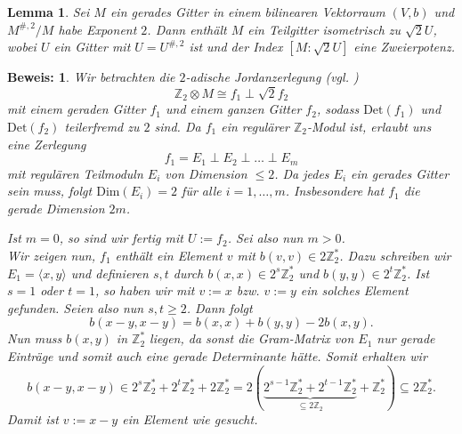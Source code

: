 \documentclass[12pt,a4paper,halfparskip,headsepline,bibtotocnumbered]{scrreprt}
\theoremstyle{nummermitklammern}
\newtheorem{lemma}[defsatzusw]{Lemma}
\theoremstyle{nonumberbreak}
\newtheorem{beweis}{Beweis:}
\newcommand{\Z}{\mathbb{Z}}
\newcommand{\Det}{\text{Det}}
\begin{document}
\begin{framed}
	\begin{lemma} \label{lem:2sub}
		Sei $M$ ein gerades Gitter in einem bilinearen Vektorraum $(V,b)$ und $M^{\#, 2} / M$ habe Exponent $2$. Dann enthält $M$ ein Teilgitter isometrisch zu $\sqrt{2}U$, wobei $U$ ein Gitter mit $U = U^{\#,2}$ ist und der Index $ \left[M :\sqrt{2} U \right]$ eine Zweierpotenz. 
	\end{lemma}
\end{framed}

\begin{beweis}
	Wir betrachten die $2$-adische Jordanzerlegung (vgl. \cite[(7.1)]{conway})
	\begin{equation*}
		\Z_2 \otimes M \cong f_1 \perp \sqrt{2} f_2
	\end{equation*}
	mit einem geraden Gitter $f_1$ und einem ganzen Gitter $f_2$, sodass $\Det(f_1)$ und  $\Det(f_2)$ teilerfremd zu $2$ sind. Da $f_1$ ein regulärer $\Z_2$-Modul ist, erlaubt uns \cite[Satz (4.1)]{kneser} eine Zerlegung
	\begin{equation*}
		f_1 = E_1 \perp E_2 \perp \dots \perp E_m
	\end{equation*}
	mit regulären Teilmoduln $E_i$ von Dimension $\leq 2$. Da jedes $E_i$ ein gerades Gitter sein muss, folgt $\text{Dim}(E_i) = 2$ für alle $i=1, \dots, m$. Insbesondere hat $f_1$ die gerade Dimension $2m$.\par
	Ist $m = 0$, so sind wir fertig mit $U := f_2$. Sei also nun $m > 0$.\\
	Wir zeigen nun, $f_1$ enthält ein Element $v$ mit $b(v,v) \in 2 \Z_2^\ast$. Dazu schreiben wir $E_1 =  \langle x, y\rangle$ und definieren $s,t$ durch $b(x,x) \in 2^s \Z_2^\ast$ und $b(y,y) \in 2^t \Z_2^\ast$. Ist $s = 1$ oder $t = 1$, so haben wir mit $v := x$ bzw. $v := y$ ein solches Element gefunden. Seien also nun $s,t \geq 2$. Dann folgt
	\begin{equation*}
		b(x-y, x-y) = b(x,x) + b(y,y) - 2 b(x,y).
	\end{equation*}
	Nun muss $b(x,y)$ in $\Z_2^\ast$ liegen, da sonst die Gram-Matrix von $E_1$ nur gerade Einträge und somit auch eine gerade Determinante hätte. Somit erhalten wir
	\begin{equation*}
		b(x-y, x-y) \in 2^s \Z_2^\ast + 2^t \Z_2^\ast + 2 \Z_2^\ast = 2 ( \underbrace{2^{s-1} \Z_2^\ast + 2^{t-1} \Z_2^\ast}_{\subseteq 2 \Z_2} + \Z_2^\ast )  \subseteq 2 \Z_2^\ast.
	\end{equation*}
	Damit ist $v := x-y$ ein Element wie gesucht.\\

\end{beweis}
\end{document}
